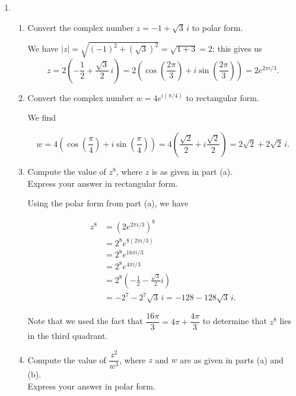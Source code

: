 \documentclass[12pt]{article}
\newcommand{\points}[1]{\marginpar{\hspace{24pt}[#1]}}
\newcommand{\abs}[1]{\lvert #1\rvert}
\begin{document}
\begin{enumerate}
 \item \begin{enumerate}
\item Convert the complex number $z=-1+\sqrt{3}\,i$ to polar form. \points{3}

\bigskip

We have $\abs{z} = \sqrt{(-1)^2+(\sqrt{3})^2} = \sqrt{1+3} = 2$; this gives us
\[
 z = 2\left(-\frac{1}{2}+\frac{\sqrt{3}}{2}\,i\right) = 2\left(\cos\left(\frac{2\pi}{3}\right)+i\sin\left(\frac{2\pi}{3}\right)\right) = 2e^{2\pi i/3}.
\]

\vspace{0.25in}

\item Convert the complex number $w=4e^{i(\pi/4)}$ to rectangular form. \points{2}

\bigskip

We find

\[
 w = 4\left(\cos\left(\frac{\pi}{4}\right)+i\sin\left(\frac{\pi}{4}\right)\right) = 4\left(\frac{\sqrt{2}}{2}+i\frac{\sqrt{2}}{2}\right) = 2\sqrt{2}+2\sqrt{2}\,i.
\]

\vspace{0.25in}

 \item Compute the value of $z^8$, where $z$ is as given in part (a).\points{4}\\
 Express your answer in rectangular form. 


\bigskip

Using the polar form from part (a), we have

\begin{align*}
 z^8 & = (2e^{2\pi i/3})^8\\
 & = 2^8e^{8(2\pi i/3)}\\
 & = 2^8e^{16\pi i/3}\\
 & = 2^8e^{4\pi i/3}\\
 & = 2^8\left(-\frac{1}{2}-\frac{\sqrt{3}}{2}i\right)\\
 & = -2^7-2^7\sqrt{3}\,i = -128-128\sqrt{3}\,i.
\end{align*}

Note that we used the fact that $\dfrac{16\pi}{3} = 4\pi + \dfrac{4\pi}{3}$ to determine that $z^8$ lies in the third quadrant.

\bigskip

 \item Compute the value of $\dfrac{z^2}{w^3}$, where $z$ and $w$ are as given in parts (a) and (b). \points{3}\\
Express your answer in polar form. 


\end{enumerate}
\end{enumerate}
\end{document}
